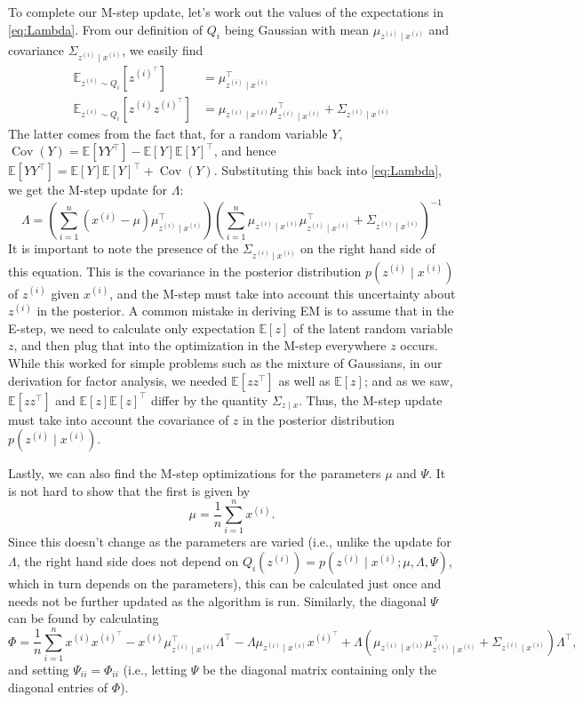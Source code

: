 To complete our M-step update, let's work out the values of the expectations in \cref{eq:Lambda}. From our definition of $Q_i$ being Gaussian with mean
$\mu_{z^{(i)} \mid x^{(i)}}$ and covariance $\Sigma_{z^{(i)} \mid x^{(i)}}$, we easily find
\begin{align*}
    \mathbb E_{z^{(i)}\sim Q_i}\left[z^{(i)^\top}\right] &= \mu^\top_{z^{(i)} \mid x^{(i)}}\\
    \mathbb E_{z^{(i)}\sim Q_i}\left[z^{(i)}z^{(i)^\top}\right] &= \mu_{z^{(i)} \mid x^{(i)}}\mu^\top_{z^{(i)} \mid x^{(i)}} + \Sigma_{z^{(i)} \mid x^{(i)}}
\end{align*}
The latter comes from the fact that, for a random variable $Y$, $\operatorname{Cov}(Y) = \mathbb E[Y Y^\top] - \mathbb E[Y]\mathbb E[Y]^\top$, and hence
$\mathbb E[Y Y^\top] = \mathbb E[Y]\mathbb E[Y]^\top + \operatorname{Cov}(Y)$. Substituting this back into \cref{eq:Lambda}, we get the M-step update for $\Lambda$:
\begin{equation}\label{eq:Lambda_m_step}
    \Lambda = \left(\sum^n_{i=1} (x^{(i)} - \mu )\mu^\top_{z^{(i)} \mid x^{(i)}}\right) \left(\sum^n_{i=1} \mu_{z^{(i)} \mid x^{(i)}}\mu^\top_{z^{(i)} \mid x^{(i)}} + \Sigma_{z^{(i)} \mid x^{(i)}}\right)^{-1}
\end{equation}
It is important to note the presence of the $\Sigma_{z^{(i)} \mid x^{(i)}}$ on the right hand side of
this equation. This is the covariance in the posterior distribution $p(z^{(i)} \mid x^{(i)})$
of $z^{(i)}$ given $x^{(i)}$, %
and the M-step must take into account this uncertainty
about $z^{(i)}$ in the posterior. A common mistake in deriving EM is to assume
that in the E-step, we need to calculate only expectation $\mathbb E[z]$ of the latent
random variable $z$, and then plug that into the optimization in the M-step
everywhere $z$ occurs. While this worked for simple problems such as the
mixture of Gaussians, in our derivation for factor analysis, we needed $\mathbb E[zz^\top
]$ as well as $\mathbb E[z]$; and as we saw, %
$\mathbb E[zz^\top]$ and $\mathbb E[z]\mathbb E[z]^\top$ differ by the quantity $\Sigma_{z \mid x}$.
Thus, the M-step update must take into account the covariance of $z$ in the
posterior distribution $p(z^{(i)} \mid x^{(i)})$.

Lastly, we can also find the M-step optimizations for the parameters $\mu$ 
and $\Psi$. It is not hard to show that the first is given by
\[
    \mu = \frac{1}{n} \sum_{i=1}^n x^{(i)}.
\]
Since this doesn't change as the parameters are varied (i.e., unlike the update
for $\Lambda$, the right hand side does not depend on $Q_i(z^{(i)}) = p(z^{(i)} \mid x^{(i)}; \mu ,\Lambda , \Psi)$,
which in turn depends on the parameters), this can be calculated just once
and needs not be further updated as the algorithm is run. Similarly, the
diagonal $\Psi$ can be found by calculating
\[
\Phi = \frac{1}{n}
\sum^n_{i=1} x^{(i)}x^{(i)^\top} - x^{(i)}\mu^\top_{z^{(i)} \mid x^{(i)}}\Lambda^\top - \Lambda \mu_{z^{(i)} \mid x^{(i)}} x^{(i)^\top} + \Lambda \left(\mu_{z^{(i)} \mid x^{(i)}}\mu^\top_{z^{(i)} \mid x^{(i)}} + \Sigma_{z^{(i)} \mid x^{(i)}}\right)\Lambda^\top,
\]    
and setting $\Psi_{ii} = \Phi_{ii}$ (i.e., letting $\Psi$ be the diagonal matrix containing only
the diagonal entries of $\Phi$).
